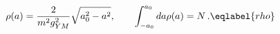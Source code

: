 \begin{equation}
\rho(a)=\frac{2}{m^2 g_{YM}^2}\sqrt{a_0^2-a^2},\qquad 
\int_{-a_0}^{a_0}da \rho(a)=N\,.
\eqlabel{rho}
\end{equation}


